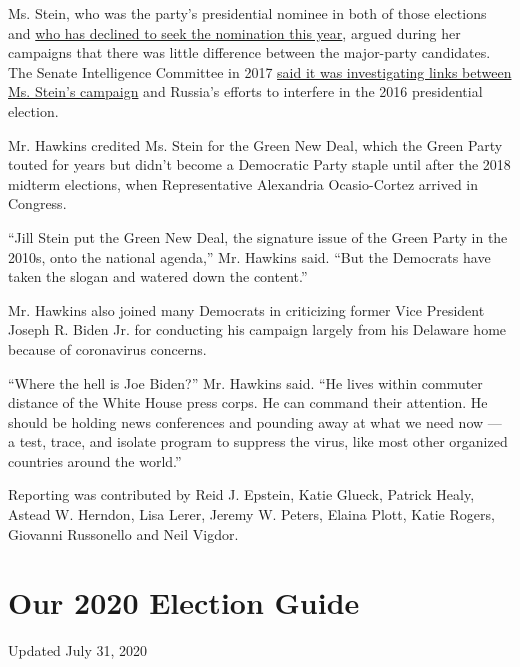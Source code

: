 Ms. Stein, who was the party's presidential nominee in both of those
elections and
\href{https://www.nytimes.com/2018/08/01/us/politics/green-party-midterm-elections.html}{who
has declined to seek the nomination this year}, argued during her
campaigns that there was little difference between the major-party
candidates. The Senate Intelligence Committee in 2017
\href{https://www.nytimes.com/2017/12/19/us/politics/jill-stein-russian-election-interference-senate-intelligence.html}{said
it was investigating links between Ms. Stein's campaign} and Russia's
efforts to interfere in the 2016 presidential election.

Mr. Hawkins credited Ms. Stein for the Green New Deal, which the Green
Party touted for years but didn't become a Democratic Party staple until
after the 2018 midterm elections, when Representative Alexandria
Ocasio-Cortez arrived in Congress.

``Jill Stein put the Green New Deal, the signature issue of the Green
Party in the 2010s, onto the national agenda,'' Mr. Hawkins said. ``But
the Democrats have taken the slogan and watered down the content.''

Mr. Hawkins also joined many Democrats in criticizing former Vice
President Joseph R. Biden Jr. for conducting his campaign largely from
his Delaware home because of coronavirus concerns.

``Where the hell is Joe Biden?'' Mr. Hawkins said. ``He lives within
commuter distance of the White House press corps. He can command their
attention. He should be holding news conferences and pounding away at
what we need now --- a test, trace, and isolate program to suppress the
virus, like most other organized countries around the world.''

Reporting was contributed by Reid J. Epstein, Katie Glueck, Patrick
Healy, Astead W. Herndon, Lisa Lerer, Jeremy W. Peters, Elaina Plott,
Katie Rogers, Giovanni Russonello and Neil Vigdor.

\hypertarget{our-2020-election-guide}{%
\section{Our 2020 Election Guide}\label{our-2020-election-guide}}

Updated July 31, 2020

